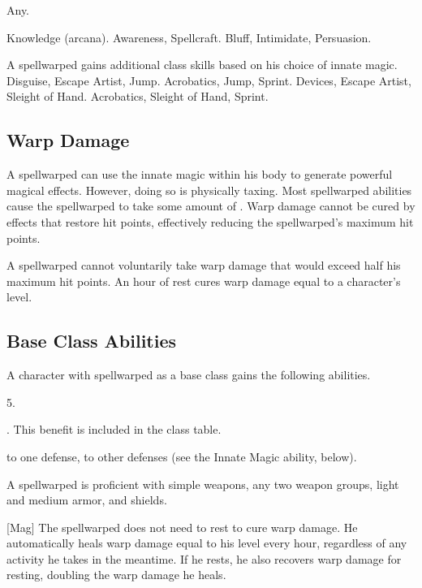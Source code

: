      Any.

     Knowledge (arcana).
     Awareness, Spellcraft.
     Bluff, Intimidate, Persuasion.

    A spellwarped gains additional class skills based on his choice of innate magic.
     Disguise, Escape Artist, Jump.
     Acrobatics, Jump, Sprint.
     Devices, Escape Artist, Sleight of Hand.
     Acrobatics, Sleight of Hand, Sprint.

    \subsection{Warp Damage}\label{Warp Damage}
        A spellwarped can use the innate magic within his body to generate powerful magical effects.
        However, doing so is physically taxing.
        Most spellwarped abilities cause the spellwarped to take some amount of .
        Warp damage cannot be cured by effects that restore hit points, effectively reducing the spellwarped's maximum hit points.

        A spellwarped cannot voluntarily take warp damage that would exceed half his maximum hit points.
        An hour of rest cures warp damage equal to a character's level.

    \subsection{Base Class Abilities}
        A character with spellwarped as a base class gains the following abilities.

         5.

         . This benefit is included in the class table.

          to one defense,  to other defenses (see the Innate Magic ability, below).

        A spellwarped is proficient with simple weapons, any two weapon groups, light and medium armor, and shields.

        [Mag]
        The spellwarped does not need to rest to cure warp damage.
        He automatically heals warp damage equal to his level every hour, regardless of any activity he takes in the meantime.
        If he rests, he also recovers warp damage for resting, doubling the warp damage he heals.

